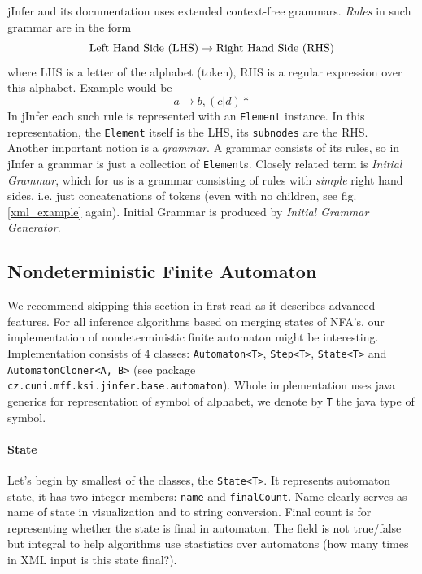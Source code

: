 \documentclass[a4paper,10pt,oneside]{article}
\newcommand{\code}[1]{\texttt{#1}}
\newcommand{\jmodule}[1]{\emph{#1}}
\begin{document}
jInfer and its documentation uses extended context-free grammars\cite{extendedcfg}.
\emph{Rules} in such grammar are in the form
$$
  \textnormal{Left Hand Side (LHS)} \to \textnormal{Right Hand Side (RHS)}
$$
where LHS is a letter of the alphabet (token), RHS is a regular expression over this alphabet. Example would be
$$
  a \to b, (c | d)\ast
$$
In jInfer each such rule is represented with an \code{Element} instance. In this representation, the \code{Element} itself is the LHS, its \code{subnodes} are the RHS.\\

Another important notion is a \emph{grammar}. A grammar consists of its rules, so in jInfer a grammar is just a collection of \code{Element}s. Closely related term is \emph{Initial Grammar}, which for us is a grammar consisting of rules with \emph{simple} right hand sides, i.e. just concatenations of tokens (even with no children, see fig. \ref{xml_example} again). Initial Grammar is produced by \jmodule{Initial Grammar Generator}. %

\subsection{Nondeterministic Finite Automaton}
We recommend skipping this section in first read as it describes advanced features.
For all inference algorithms based on merging states of NFA's, our implementation of nondeterministic finite automaton might be interesting.
Implementation consists of 4 classes: \code{Automaton<T>}, \code{Step<T>}, \code{State<T>} and \code{AutomatonCloner<A, B>} (see package \code{cz.cuni.mff.ksi.jinfer.base.automaton}).
Whole implementation uses java generics for representation of symbol of alphabet, we denote by \code{T} the java type of symbol.

\paragraph{State}
Let's begin by smallest of the classes, the \code{State<T>}.
It represents automaton state, it has two integer members: \code{name} and \code{finalCount}.
Name clearly serves as name of state in visualization and to string conversion.
Final count is for representing whether the state is final in automaton.
The field is not true/false but integral to help algorithms use stastistics over automatons (how many times in XML input is this state final?).
\end{document}

